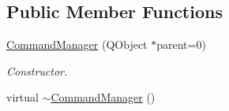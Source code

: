 \subsection*{Public Member Functions}
\begin{DoxyCompactItemize}
\item 
\hyperlink{class_command_manager_aec2d1b384154f66d8739cff5fe5430ac}{Command\-Manager} (Q\-Object $\ast$parent=0)
\begin{DoxyCompactList}\small\item\em Constructor. \end{DoxyCompactList}\item 
\hypertarget{class_command_manager_a608ee043482ce1ac1868edb3d21beccf}{virtual \hyperlink{class_command_manager_a608ee043482ce1ac1868edb3d21beccf}{$\sim$\-Command\-Manager} ()}\label{class_command_manager_a608ee043482ce1ac1868edb3d21beccf}


\end{DoxyCompactItemize}

